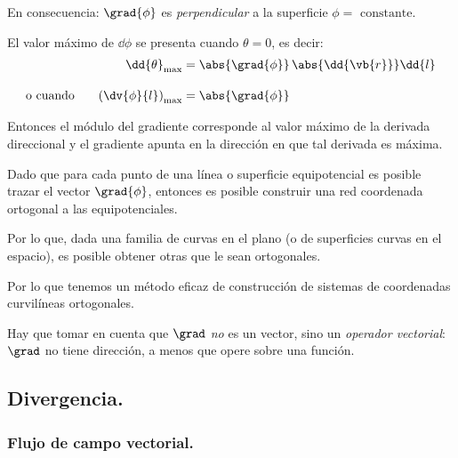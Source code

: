 En consecuencia: $\grad{\phi}$ es \emph{perpendicular} a la superficie $\phi = \mbox{ constante}$.
\par
El valor máximo de $\dd{\phi}$ se presenta cuando $\theta = 0$, es decir:
\begin{align*}
\dd{\theta}_{\max} &= \abs{\grad{\phi}} \, \abs{\dd{\vb{r}}} \dd{l} \\[1em]
\mbox{o cuando } \hspace{0.5cm} \left( \dv{\phi}{l} \right)_{\max} &= \abs{\grad{\phi}}
\end{align*}

Entonces el módulo del gradiente corresponde al valor máximo de la derivada direccional y el gradiente apunta en la dirección en que tal derivada es máxima.
\par
Dado que para cada punto de una línea o superficie equipotencial es posible trazar el vector $\grad{\phi}$, entonces es posible construir una red coordenada ortogonal a las equipotenciales.
\par
Por lo que, dada una familia de curvas en el plano (o de superficies curvas en el espacio), es posible obtener otras que le sean ortogonales.
\par
Por lo que tenemos un método eficaz de construcción de sistemas de coordenadas curvilíneas ortogonales.
\par
Hay que tomar en cuenta que $\grad$ \emph{no} es un vector, sino un \emph{operador vectorial}: $\grad$ no tiene dirección, a menos que opere sobre una función.

\subsection{Divergencia.}

\subsubsection{Flujo de campo vectorial.}

